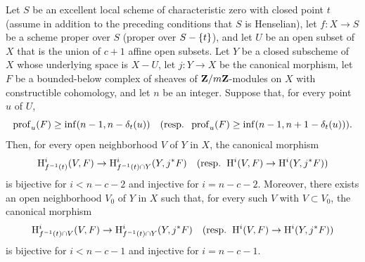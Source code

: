 \begin{proposition} \label{XIV.4.9}
Let $S$ be an excellent local scheme of characteristic zero with closed point $t$ (\resp assume in addition to the preceding conditions that $S$ is Henselian), let $f\colon X\to S$ be a scheme proper over $S$ (\resp proper over $S-\{ \sisi{s}{t}\}$), and let $U$ be an open subset of $X$ that is the union of $c+1$ affine open subsets. Let $Y$ be a closed subscheme of $X$ whose underlying space is $X-U$, let $j\colon Y\to X$ be the canonical morphism, let $F$ be a bounded-below complex of sheaves of $\ZZ/m\ZZ$-modules on $X$ with constructible cohomology, and let $n$ be an integer. Suppose that, for every point $u$ of $U$,
$$
\prof_{u}(F)\geq\inf(n-1, n-\delta_{t}(u))\quad(\textrm{\resp }\;\prof_{u}(F)\geq\inf(n-1, n+1-\delta_{t}(u))).
$$
Then, for every open neighborhood $V$ of $Y$ in $X$, the canonical morphism\pageoriginale
$$
\H_{f^{-1}(t)}^{i}(V, F)\to\H_{f^{-1}(t)\cap Y}^{i}(Y, j^{\ast}F)\quad(\textrm{\resp }\;\H^{i}(V, F)\to\H^{i}(Y, j^{\ast}F))
$$
is bijective for $i<n-c-2$ and injective for $i=n-c-2$. Moreover, there exists an open neighborhood $V_{0}$ of $Y$ in $X$ such that, for every such $V$ with $V\subset V_{0}$, the canonical morphism
$$
\H_{f^{-1}(t)\cap V}^{i}(V, F)\to\H_{f^{-1}(t)\cap Y}^{i}(Y, j^{\ast}F)\quad(\textrm{\resp }\;\H^{i}(V, F)\to\H^{i}(Y, j^{\ast}F))
$$
is bijective for $i<n-c-1$ and injective for $i=n-c-1$.
\end{proposition}

